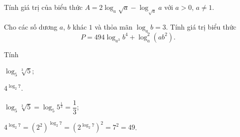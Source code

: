 \begin{bt}%
Tính giá trị của biểu thức $A=2 \log_a \sqrt{a}-\log_{\sqrt{a}} a$ với $a>0$, $a \neq 1$.
\end{bt}

\begin{bt}%
	Cho các số dương $a$, $b$ khác $1$ và thỏa mãn $\log_{a}b=3$. Tính giá trị biểu thức 
	\[
	P=494\log_{a^3}b^4+\log_a^2(ab^2).
	\]
\end{bt}

\begin{bt}%
 
	Tính
	\begin{listEX}[2]
		\item  $\log _{5} \sqrt[3]{5}$;
		\item $4^{\log _{2} 7}$.
	\end{listEX}
	\loigiai
	{\begin{listEX}[1]
			\item $\log _{5} \sqrt[3]{5}=\log _{5} 5^{\frac{1}{3}}=\dfrac{1}{3}$;
			\item $4^{\log _{2} 7}=\left(2^{2}\right)^{\log _{2} 7}=\left(2^{\log _{2} 7}\right)^{2}=7^{2}=49$.
		\end{listEX}
	}
\end{bt}

